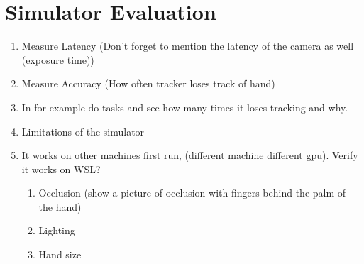 \section{Simulator Evaluation}
\begin{enumerate}
	\item Measure Latency (Don't forget to mention the latency of the camera as well (exposure time))
	\item Measure Accuracy (How often tracker loses track of hand)
	\item In for example do tasks and see how many times it loses tracking and why.
	\item Limitations of the simulator
	\item It works on other machines first run, (different machine different gpu). Verify it works on WSL?
	\begin {enumerate}
		\item Occlusion (show a picture of occlusion with fingers behind the palm of the hand)
		\item Lighting
		\item Hand size
	\end{enumerate}

\end{enumerate}